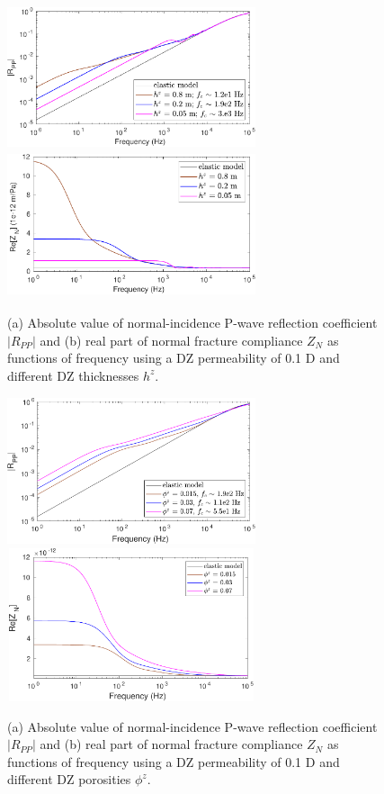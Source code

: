 \documentclass[draft]{agujournal2019}
\begin{document}
\begin{figure}
\centering
    \subcaptionbox{}
      {
       \includegraphics[width=73mm, height=43
       mm]{figures/elasporo_1mm_hsen_k1e-1d.pdf}
        }
    \subcaptionbox{}
      {
        \includegraphics[width=73mm, height=43mm]{figures/elasporo_1mm_hzsen_k1e-1d.pdf}
        }
\caption {(a) Absolute value of normal-incidence P-wave reflection coefficient $|R_{PP}|$ and (b) real part of normal fracture compliance $Z_N$ as functions of frequency using a DZ permeability of 0.1 D and different DZ thicknesses $h^z$.}
\label{fig:4}
\end{figure}

\begin{figure}
\centering
    \subcaptionbox{}
      {
       \includegraphics[width=73mm, height=43 mm]{figures/rt_dz_modphi_perm1e-1d.pdf}
        }
    \subcaptionbox{}
      {
        \includegraphics[width=73mm, height=45mm]{figures/zn_dz_modphi_perm1e-1d.pdf}
        }
\caption {(a) Absolute value of normal-incidence P-wave reflection coefficient $|R_{PP}|$ and (b) real part of normal fracture compliance $Z_N$ as functions of frequency using a DZ permeability of 0.1 D and different DZ porosities $\phi^z$.}
\label{fig:5}
\end{figure}
\end{document}
